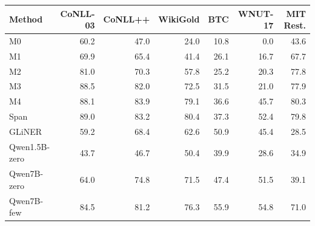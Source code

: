 \begin{tabular}{@{}lrrrrrr@{}}
\toprule
Method & CoNLL-03 & CoNLL++ & WikiGold & BTC & WNUT-17 & MIT Rest. \\
\midrule
M0 & 60.2 & 47.0 & 24.0 & 10.8 & 0.0 & 43.6 \\
M1 & 69.9 & 65.4 & 41.4 & 26.1 & 16.7 & 67.7 \\
M2 & 81.0 & 70.3 & 57.8 & 25.2 & 20.3 & 77.8 \\
M3 & 88.5 & 82.0 & 72.5 & 31.5 & 21.0 & 77.9 \\
M4 & 88.1 & 83.9 & 79.1 & 36.6 & 45.7 & 80.3 \\
Span & 89.0 & 83.2 & 80.4 & 37.3 & 52.4 & 79.8 \\
GLiNER & 59.2 & 68.4 & 62.6 & 50.9 & 45.4 & 28.5 \\
Qwen1.5B-zero & 43.7 & 46.7 & 50.4 & 39.9 & 28.6 & 34.9 \\
Qwen7B-zero & 64.0 & 74.8 & 71.5 & 47.4 & 51.5 & 39.1 \\
Qwen7B-few & 84.5 & 81.2 & 76.3 & 55.9 & 54.8 & 71.0 \\
\bottomrule
\end{tabular}
